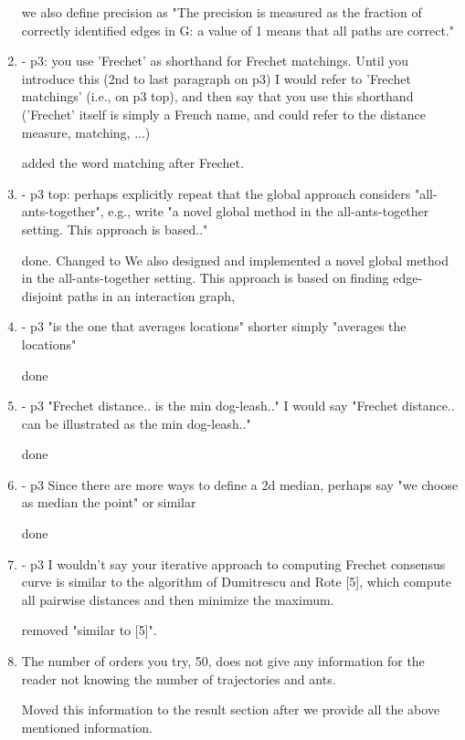 \documentclass[12pt]{article}
\begin{document}
\begin{enumerate}
we also define precision as "The precision is measured as the fraction of correctly identified edges in G: a value
of 1 means that all paths are correct."


\item - p3: you use 'Frechet' as shorthand for Frechet matchings. Until you introduce this (2nd to last paragraph on p3) I would refer to 'Frechet matchings' (i.e., on p3 top), and then say that you use this shorthand ('Frechet' itself is simply a French name, and could refer to the distance measure, matching, ...)

added the word matching after Frechet.

\item - p3 top: perhaps explicitly repeat that the global approach considers "all-ants-together", e.g., write "a novel global method in the all-ants-together setting. This approach is based.."

done. Changed to 
We
also designed and implemented 
a novel global
method  
in the all-ants-together setting. This approach is 
based on finding edge-disjoint paths in an interaction graph,


\item - p3 "is the one that averages locations" shorter simply "averages the locations"

done


\item - p3 "Frechet distance.. is the min dog-leash.." I would say "Frechet distance.. can be illustrated as the min dog-leash.."

done

\item - p3 Since there are more ways to define a 2d median, perhaps say "we choose as median the point" or similar

done

\item {- p3 I wouldn't say your iterative approach to computing Frechet consensus curve is similar to the algorithm of Dumitrescu and Rote [5], which compute all pairwise distances and then minimize the maximum.}

removed "similar to [5]".

\item { The number of orders you try, 50, does not give any information for the reader not knowing the number of trajectories and ants.}

Moved this information to the result section after we provide all the above mentioned information.


\end{enumerate}
\end{document}

